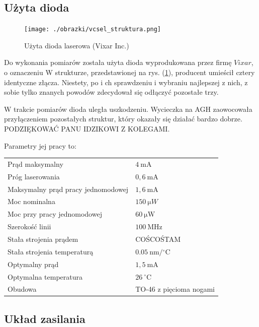 \documentclass[a4paper,10pt]{article}
\begin{document}
\subsection{Użyta dioda}

\begin{figure}
\begin{center}
 \texttt{[image: ./obrazki/vcsel\_struktura.png]}
\end{center}
\caption{Użyta dioda laserowa (Vixar Inc.)}
\label{struktura}
\end{figure}

Do wykonania pomiarów została użyta dioda wyprodukowana przez firmę $Vixar$, o oznaczeniu
W strukturze, przedstawionej na rys. (\ref{struktura}), producent umieścił cztery identyczne złącza. Niestety, po i ch sprawdzeniu i wybraniu najlepszej z nich, z sobie tylko znanych powodów zdecydował się odłączyć pozostałe trzy.

W trakcie pomiarów dioda uległa uszkodzeniu. Wycieczka na AGH zaowocowała przyłączeniem pozostałych struktur, który okazały się działać bardzo dobrze. PODZIĘKOWAĆ PANU IDZIKOWI Z KOLEGAMI.

Parametry jej pracy to:
\begin{center}
\begin{tabular}{ll}
Prąd maksymalny & $4 ~\mathrm{mA}$\\
Próg laserowania & $0{,}6~\mathrm{mA}$\\
Maksymalny prąd pracy jednomodowej & $1{,}6~\mathrm{mA}$\\
Moc nominalna & $150~\mathrm{\mu }W$\\
Moc przy pracy jednomodowej & $60~\mathrm{\mu W}$\\
Szerokość linii & $100~\mathrm{MHz}$\\
Stała strojenia prądem & COŚCOŚTAM\\
Stała strojenia temperaturą & $0.05 ~\mathrm{nm/{}^{\circ}C}$\\
Optymalny prąd & $1{,}5 ~\mathrm{mA}$\\
Optymalna temperatura & $26~\mathrm{ {}^{\circ}C}$ \\
Obudowa & TO-46 z pięcioma nogami
\end{tabular}
\end{center}


\subsection{Układ zasilania}
\end{document}
